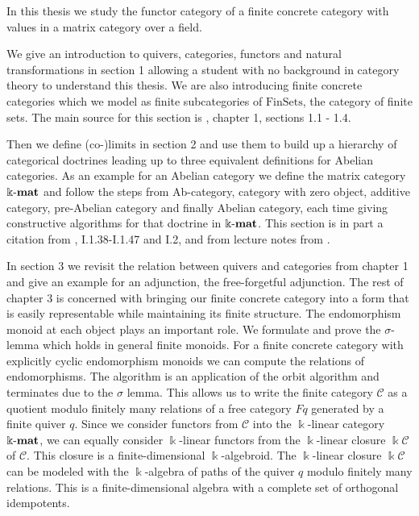 In this thesis we study the functor category of a finite concrete category with values in a matrix category over a field.

We give an introduction to quivers, categories, functors and natural transformations in section 1 allowing a student with
no background in category theory to understand this thesis. We are also introducing finite concrete categories which we
model as finite subcategories of $\mathrm{FinSets}$, the category of finite sets.
The main source for this section is \cite{[context]}, chapter 1, sections 1.1 - 1.4.

Then we define (co-)limits in section 2 and use them to build up a hierarchy of categorical doctrines leading up
to three equivalent definitions for Abelian categories.
As an example for an Abelian category we define the matrix category $\Bbbk\textnormal{-}\mathbf{mat}$
and follow the steps from Ab-category, category with zero object, additive category, pre-Abelian category and
finally Abelian category, each time giving constructive algorithms for that doctrine in $\Bbbk\textnormal{-}\mathbf{mat}$. This section is in part a 
citation from \cite{[Posur]}, I.1.38-I.1.47 and I.2, and from lecture notes from \cite{[AlgAlg]}.

In section 3 we revisit the relation between quivers and categories from chapter 1
and give an example for an adjunction, the free-forgetful adjunction. The rest of chapter 3 is concerned with
bringing our finite concrete category into a form that is easily representable while maintaining its finite structure.
The endomorphism monoid at each object plays an important role. We formulate and prove the $\sigma$-lemma
which holds in general finite monoids. For a finite concrete category with explicitly
cyclic endomorphism monoids we can compute the relations of endomorphisms. The algorithm is an application
of the orbit algorithm and terminates due to the $\sigma$ lemma.
This allows us to write the finite category $\mathcal{C}$ as a quotient modulo finitely many relations of a free category $Fq$
generated by a finite quiver $q$.
Since we consider functors from $\mathcal{C}$ into the $\Bbbk$-linear category $\Bbbk\textnormal{-}\mathbf{mat}$, we can equally consider $\Bbbk$-linear functors
from the $\Bbbk$-linear closure $\Bbbk\mathcal{C}$ of $\mathcal{C}$. This closure is a finite-dimensional $\Bbbk$-algebroid. 
The $\Bbbk$-linear closure $\Bbbk\mathcal{C}$ can be modeled with the $\Bbbk$-algebra of paths of the
quiver $q$ modulo finitely many relations. This is a finite-dimensional algebra with a complete set of orthogonal idempotents.

